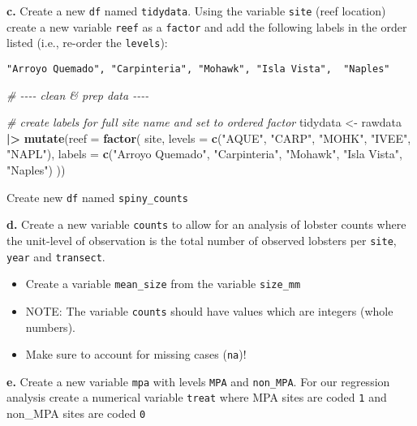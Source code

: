 \documentclass[
]{article}
\newenvironment{Shaded}{\begin{snugshade}}{\end{snugshade}}
\newcommand{\AttributeTok}[1]{\textcolor[rgb]{0.13,0.29,0.53}{#1}}
\newcommand{\CommentTok}[1]{\textcolor[rgb]{0.56,0.35,0.01}{\textit{#1}}}
\newcommand{\FunctionTok}[1]{\textcolor[rgb]{0.13,0.29,0.53}{\textbf{#1}}}
\newcommand{\NormalTok}[1]{#1}
\newcommand{\OtherTok}[1]{\textcolor[rgb]{0.56,0.35,0.01}{#1}}
\newcommand{\SpecialCharTok}[1]{\textcolor[rgb]{0.81,0.36,0.00}{\textbf{#1}}}
\newcommand{\StringTok}[1]{\textcolor[rgb]{0.31,0.60,0.02}{#1}}
\providecommand{\tightlist}{%
  \setlength{\itemsep}{0pt}\setlength{\parskip}{0pt}}
\begin{document}
\textbf{c.} Create a new \texttt{df} named \texttt{tidydata}. Using the
variable \texttt{site} (reef location) create a new variable
\texttt{reef} as a \texttt{factor} and add the following labels in the
order listed (i.e., re-order the \texttt{levels}):

\begin{verbatim}
"Arroyo Quemado", "Carpinteria", "Mohawk", "Isla Vista",  "Naples"
\end{verbatim}

\begin{Shaded}
\begin{Highlighting}[]
\CommentTok{\# {-}{-}{-}{-} clean \& prep data {-}{-}{-}{-}}

\CommentTok{\# create labels for full site name and set to ordered factor}
\NormalTok{tidydata }\OtherTok{\textless{}{-}}\NormalTok{ rawdata }\SpecialCharTok{|\textgreater{}}
    \FunctionTok{mutate}\NormalTok{(}\AttributeTok{reef =} \FunctionTok{factor}\NormalTok{( site, }
                          \AttributeTok{levels =} \FunctionTok{c}\NormalTok{(}\StringTok{"AQUE"}\NormalTok{, }\StringTok{"CARP"}\NormalTok{, }\StringTok{"MOHK"}\NormalTok{, }\StringTok{"IVEE"}\NormalTok{,  }\StringTok{"NAPL"}\NormalTok{),}
                          \AttributeTok{labels =} \FunctionTok{c}\NormalTok{(}\StringTok{"Arroyo Quemado"}\NormalTok{, }\StringTok{"Carpinteria"}\NormalTok{, }\StringTok{"Mohawk"}\NormalTok{, }\StringTok{"Isla Vista"}\NormalTok{,  }\StringTok{"Naples"}\NormalTok{)}
\NormalTok{    ))}
\end{Highlighting}
\end{Shaded}

Create new \texttt{df} named \texttt{spiny\_counts}

\textbf{d.} Create a new variable \texttt{counts} to allow for an
analysis of lobster counts where the unit-level of observation is the
total number of observed lobsters per \texttt{site}, \texttt{year} and
\texttt{transect}.

\begin{itemize}
\tightlist
\item
  Create a variable \texttt{mean\_size} from the variable
  \texttt{size\_mm}
\item
  NOTE: The variable \texttt{counts} should have values which are
  integers (whole numbers).
\item
  Make sure to account for missing cases (\texttt{na})!
\end{itemize}

\textbf{e.} Create a new variable \texttt{mpa} with levels \texttt{MPA}
and \texttt{non\_MPA}. For our regression analysis create a numerical
variable \texttt{treat} where MPA sites are coded \texttt{1} and
non\_MPA sites are coded \texttt{0}
\end{document}
